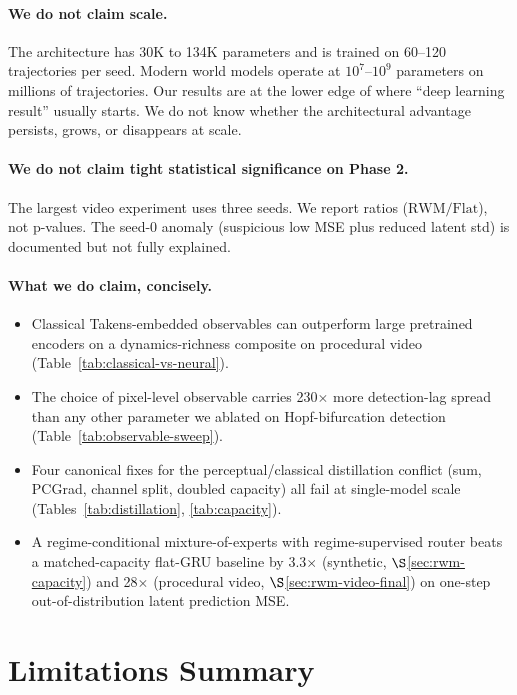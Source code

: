 \documentclass[11pt,a4paper]{article}
\begin{document}
\paragraph{We do not claim scale.} The architecture has 30K to 134K
parameters and is trained on 60--120 trajectories per seed. Modern
world models operate at $10^7$--$10^9$ parameters on millions of
trajectories. Our results are at the lower edge of where ``deep
learning result'' usually starts. We do not know whether the
architectural advantage persists, grows, or disappears at scale.

\paragraph{We do not claim tight statistical significance on Phase 2.}
The largest video experiment uses three seeds. We report ratios
($\mathrm{RWM}/\mathrm{Flat}$), not p-values. The seed-0 anomaly
(suspicious low MSE plus reduced latent std) is documented but not
fully explained.

\paragraph{What we do claim, concisely.}
\begin{itemize}
\item Classical Takens-embedded observables can outperform large
  pretrained encoders on a dynamics-richness composite on procedural
  video (Table~\ref{tab:classical-vs-neural}).
\item The choice of pixel-level observable carries 230$\times$ more
  detection-lag spread than any other parameter we ablated on
  Hopf-bifurcation detection (Table~\ref{tab:observable-sweep}).
\item Four canonical fixes for the perceptual/classical distillation
  conflict (sum, PCGrad, channel split, doubled capacity) all
  fail at single-model scale (Tables~\ref{tab:distillation},
  \ref{tab:capacity}).
\item A regime-conditional mixture-of-experts with regime-supervised
  router beats a matched-capacity flat-GRU baseline by 3.3$\times$
  (synthetic, $\S$\ref{sec:rwm-capacity}) and 28$\times$ (procedural
  video, $\S$\ref{sec:rwm-video-final}) on one-step out-of-distribution
  latent prediction MSE.
\end{itemize}

\section{Limitations Summary}
\label{sec:limitations}
\end{document}
